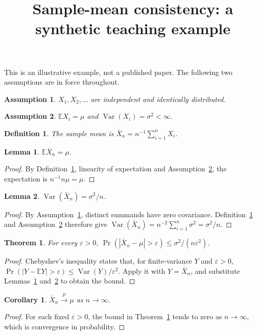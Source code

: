 \documentclass{article}
\title{Sample-mean consistency: a synthetic teaching example}
\newtheorem{assumption}{Assumption}
\newtheorem{definition}{Definition}
\newtheorem{lemma}{Lemma}
\newtheorem{theorem}{Theorem}
\newtheorem{corollary}{Corollary}
\begin{document}
\maketitle
This is an illustrative example, not a published paper.
The following two assumptions are in force throughout.
\begin{assumption}\label{ass:sampling}
$X_1,X_2,\ldots$ are independent and identically distributed.
\end{assumption}
\begin{assumption}\label{ass:moments}
$\mathbb{E}X_i=\mu$ and $\operatorname{Var}(X_i)=\sigma^2<\infty$.
\end{assumption}
\begin{definition}\label{def:mean}
The sample mean is $\bar X_n=n^{-1}\sum_{i=1}^{n}X_i$.
\end{definition}
\begin{lemma}\label{lem:centering}
$\mathbb{E}\bar X_n=\mu$.
\end{lemma}
\begin{proof}
By Definition~\ref{def:mean}, linearity of expectation and
Assumption~\ref{ass:moments}, the expectation is $n^{-1}n\mu=\mu$.
\end{proof}
\begin{lemma}\label{lem:variance}
$\operatorname{Var}(\bar X_n)=\sigma^2/n$.
\end{lemma}
\begin{proof}
By Assumption~\ref{ass:sampling}, distinct summands have zero covariance.
Definition~\ref{def:mean} and Assumption~\ref{ass:moments} therefore give
$\operatorname{Var}(\bar X_n)=n^{-2}\sum_{i=1}^n\sigma^2=\sigma^2/n$.
\end{proof}
\begin{theorem}\label{thm:bound}
For every $\varepsilon>0$,
$\Pr(|\bar X_n-\mu|>\varepsilon)\leq\sigma^2/(n\varepsilon^2)$.
\end{theorem}
\begin{proof}
Chebyshev's inequality states that, for finite-variance $Y$ and
$\varepsilon>0$, $\Pr(|Y-\mathbb{E}Y|>\varepsilon)\leq\operatorname{Var}(Y)/\varepsilon^2$.
Apply it with $Y=\bar X_n$, and substitute Lemmas~\ref{lem:centering}
and~\ref{lem:variance} to obtain the bound.
\end{proof}
\begin{corollary}\label{cor:consistency}
$\bar X_n\xrightarrow{p}\mu$ as $n\to\infty$.
\end{corollary}
\begin{proof}
For each fixed $\varepsilon>0$, the bound in Theorem~\ref{thm:bound}
tends to zero as $n\to\infty$, which is convergence in probability.
\end{proof}
\end{document}
